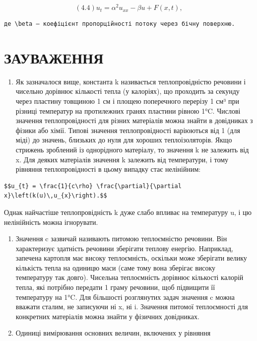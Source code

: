 \documentclass[
  ukrainian,
]{article}
\providecommand{\tightlist}{%
  \setlength{\itemsep}{0pt}\setlength{\parskip}{0pt}}
\begin{document}
\[
(4.4) u_t = \alpha^2 u_{xx} - \beta u + F(x, t),
\]

\begin{verbatim}
де \beta — коефіцієнт пропорційності потоку через бічну поверхню.
\end{verbatim}

\section{ЗАУВАЖЕННЯ}\label{ux437ux430ux443ux432ux430ux436ux435ux43dux43dux44f-3}

\begin{enumerate}
\def\labelenumi{\arabic{enumi}.}
\tightlist
\item
  Як зазначалося вище, константа k називається теплопровідністю речовини
  і чисельно дорівнює кількості тепла (у калоріях), що проходить за
  секунду через пластину товщиною 1 см і площею поперечного перерізу 1
  см³ при різниці температур на протилежних гранях пластини рівною 1°C.
  Числові значення теплопровідності для різних матеріалів можна знайти в
  довідниках з фізики або хімії. Типові значення теплопровідності
  варіюються від 1 (для міді) до значень, близьких до нуля для хороших
  теплоізоляторів. Якщо стрижень зроблений із однорідного матеріалу, то
  значення k не залежить від x. Для деяких матеріалів значення k
  залежить від температури, і тому рівняння теплопровідності в цьому
  випадку стає нелінійним:
\end{enumerate}

\begin{verbatim}
$$u_{t} = \frac{1}{c\rho} \frac{\partial}{\partial x}\left(k(u)\,u_{x}\right).$$
\end{verbatim}

Однак найчастіше теплопровідність k дуже слабо впливає на температуру u,
і цю нелінійність можна ігнорувати.

\begin{enumerate}
\def\labelenumi{\arabic{enumi}.}
\setcounter{enumi}{1}
\item
  Значення c зазвичай називають питомою теплоємністю речовини. Він
  характеризує здатність речовини зберігати теплову енергію. Наприклад,
  запечена картопля має високу теплоємність, оскільки може зберігати
  велику кількість тепла на одиницю маси (саме тому вона зберігає високу
  температуру так довго). Чисельна теплоємність дорівнює кількості
  калорій тепла, які потрібно передати 1 граму речовини, щоб підвищити
  її температуру на 1°C. Для більшості розглянутих задач значення c
  можна вважати сталим, не записуючи ні x, ні i. Значення питомої
  теплоємності для конкретних матеріалів можна знайти у фізичних
  довідниках.
\item
  Одиниці вимірювання основних величин, включених у рівняння
\end{enumerate}
\end{document}
